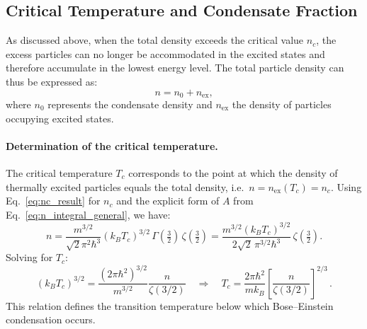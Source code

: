 \subsection*{Critical Temperature and Condensate Fraction}
As discussed above, when the total density exceeds the critical value \(n_c\), the excess particles can no longer be accommodated in the excited states and therefore accumulate in the lowest energy level.
The total particle density can thus be expressed as:
\begin{equation}
    n = n_0 + n_{\mathrm{ex}},
    \label{eq:n_total}
\end{equation}
where \( n_0 \) represents the condensate density and \( n_{\mathrm{ex}} \) the density of particles occupying excited states.

\paragraph{Determination of the critical temperature.}
The critical temperature \(T_c\) corresponds to the point at which the density of thermally excited particles equals the total density, i.e.\ \(n = n_{\mathrm{ex}}(T_c) = n_c\).  
Using Eq.~\eqref{eq:nc_result} for \(n_c\) and the explicit form of \(A\) from Eq.~\eqref{eq:n_integral_general}, we have:
\[
n = \frac{m^{3/2}}{\sqrt{2}\pi^2\hbar^3} (k_B T_c)^{3/2}
          \,\Gamma\!\left(\tfrac{3}{2}\right)
          \,\zeta\!\left(\tfrac{3}{2}\right) = 
\frac{m^{3/2}(k_B T_c)^{3/2}}{2\sqrt{2}\,\pi^{3/2}\hbar^3}\,
      \zeta\!\left(\tfrac{3}{2}\right).
\]
Solving for \(T_c\):
\begin{equation}
(k_B T_c)^{3/2} = 
\frac{(2\pi\hbar^2)^{3/2}}{m^{3/2}}
\frac{n}{\zeta(3/2)}
\quad \Longrightarrow \quad
\boxed{
T_c = 
\frac{2\pi\hbar^2}{m k_B}
\left[\frac{n}{\zeta(3/2)}\right]^{2/3}
}\, .
\label{eq:Crit_T}
\end{equation}
This relation defines the transition temperature below which Bose--Einstein condensation occurs.

